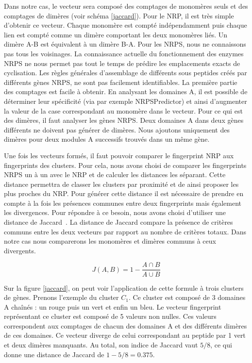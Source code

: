 Dans notre cas, le vecteur sera composé des comptages de monomères seuls et des comptages de dimères (voir schéma \ref{jaccard}).
Pour le NRP, il est très simple d'obtenir ce vecteur.
Chaque monomère est compté indépendamment puis chaque lien est compté comme un dimère comportant les deux monomères liés.
Un dimère A-B est équivalent à un dimère B-A.
Pour les NRPS, nous ne connaissons pas tous les voisinages.
La connaissance actuelle du fonctionnement des enzymes NRPS ne nous permet pas tout le temps de prédire les emplacements exacts de cyclisation.
Les règles générales d'assemblage de différents sous peptides créés par différents gènes NRPS, ne sont pas facilement identifiables.
La première partie des comptages est facile à obtenir.
En analysant les domaines A, il est possible de déterminer leur spécificité (via par exemple NRPSPredictor) et ainsi d'augmenter la valeur de la case correspondant au monomère dans le vecteur.
Pour ce qui est des dimères, il faut analyser les gènes NRPS.
Deux domaines A dans deux gènes différents ne doivent pas générer de dimères.
Nous ajoutons uniquement des dimères pour deux modules A successifs trouvés dans un même gène.


Une fois les vecteurs formés, il faut pouvoir comparer le fingerprint NRP aux fingerprints des clusters.
Pour cela, nous avons choisi de comparer les fingerprints NRPS un à un avec le NRP et de calculer les distances les séparant.
Cette distance permettra de classer les clusters par proximité et de ainsi proposer les plus proches du NRP.
Pour générer cette distance il est nécessaire de prendre en compte à la fois les présences communes entre deux fingerprints mais également les divergences.
Pour répondre à ce besoin, nous avons choisi d'utiliser une distance de Jaccard~\cite{jaccard_etude_1901}.
La distance de Jaccard compare la présence de critères communs entre les deux vecteurs par rapport au nombre de critères totaux.
Dans notre cas nous comparerons les monomères et dimères communs à ceux divergents.

\begin{equation}
  J(A,B) = 1 - \frac{A \cap B}{A \cup B}
\end{equation}

Sur la figure \ref{jaccard}, on peut voir l'application de cette formule à trois clusters de gènes.
Prenons l'exemple du cluster $C_1$.
Ce cluster est composé de 3 domaines A chaînés : un rouge puis un vert et enfin un bleu.
Le vecteur fingerprint représentant ce cluster est composé de 5 valeurs non nulles.
Ces valeurs correspondent aux comptages de chacun des domaines A et des différents dimères de ces domaines.
Ce vecteur diverge de celui correspondant au peptide par 1 vert et deux dimères manquants.
Au total, son indice de Jaccard vaut $5 / 8$, ce qui donne une distance de Jaccard de $1 - 5/8 = 0.375$.





